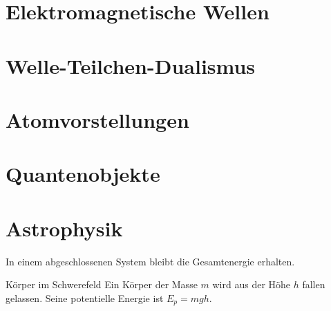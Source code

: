 \documentclass[11pt,a4paper,oneside]{article}
\begin{document}
	\newpage
	
	
	\section{Elektromagnetische Wellen}

	\section{Welle-Teilchen-Dualismus}
	\section{Atomvorstellungen}
	
	
	\section{Quantenobjekte}
	\section{Astrophysik}
	
	
	\newpage
	
	
	
	
	
	
	\newpage
	
	
	
	
	
	\begin{theo}
		In einem abgeschlossenen System bleibt die Gesamtenergie erhalten.
	\end{theo}
	
	\begin{exem}{Körper im Schwerefeld}
		Ein Körper der Masse $m$ wird aus der Höhe $h$ fallen gelassen. Seine potentielle Energie ist $E_p = mgh$.
	\end{exem}
	
\end{document}
